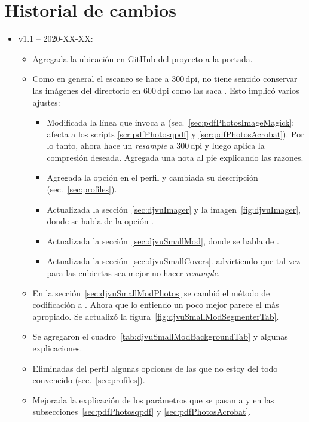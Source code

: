 \documentclass[%
	a5paper,
	10pt,
	twoside,
	openright,
	final,
]{memoir}
\begin{document}
{\chapter{Historial de cambios}
	\begin{itemize}
		\item v1.1 -- 2020-XX-XX:
			\begin{itemize}
				\item Agregada la ubicación en GitHub del proyecto a la portada.
				\item Como en general el escaneo se hace a 300\,dpi, no tiene sentido conservar las imágenes del directorio  en 600\,dpi como las saca \scantailor. Esto implicó varios ajustes:
				\begin{itemize}
					\item Modificada la línea que invoca a \imagemagick (sec.~\ref{sec:pdfPhotosImageMagick}; afecta a los scripts \ref{scr:pdfPhotosqpdf} y \ref{scr:pdfPhotosAcrobat}). Por lo tanto, ahora \imagemagick hace un \emph{resample} a 300\,dpi y luego aplica la compresión \jpeg deseada. Agregada una nota al pie explicando las razones.
					\item Agregada la opción  en el perfil  y cambiada su descripción (sec.~\ref{sec:profiles}).
					\item Actualizada la sección~\ref{sec:djvuImager} y la imagen~\ref{fig:djvuImager}, donde se habla de la opción .
					\item Actualizada la sección~\ref{sec:djvuSmallMod}, donde se habla de .
					\item Actualizada la sección~\ref{sec:djvuSmallCovers}. advirtiendo que tal vez para las cubiertas sea mejor no hacer \emph{resample}.
				\end{itemize}
				\item En la sección~\ref{sec:djvuSmallModPhotos} se cambió el método de codificación a . Ahora que lo entiendo un poco mejor parece el más apropiado. Se actualizó la figura~\ref{fig:djvuSmallModSegmenterTab}.
				\item Se agregaron el cuadro~\ref{tab:djvuSmallModBackgroundTab} y algunas explicaciones.
				\item Eliminadas del perfil  algunas opciones de las que no estoy del todo convencido (sec.~\ref{sec:profiles}).
				\item Mejorada la explicación de los parámetros que se pasan a \qpdf y \acrobat en las subsecciones~\ref{sec:pdfPhotosqpdf} y \ref{sec:pdfPhotosAcrobat}.

\end{itemize}
\end{itemize}}
\end{document}
